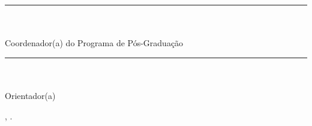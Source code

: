 {    \begin{Center}
        \vspace{1cm}
        \rule{6.5cm}{1pt}\\
        \coordenadorTitulacao\space \coordenador\\
        Coordenador(a) do Programa de Pós-Graduação

        \vspace{1cm}
        \rule{6.5cm}{1pt}\\
        \orientadorTitulacao\space \orientador\\
        Orientador(a)

        \vspace{\fill}
        \cidadeDefesa, \anoEntrega.
    \end{Center}
}